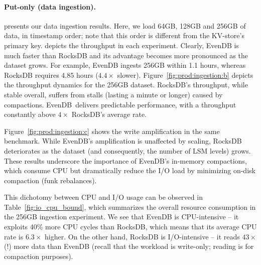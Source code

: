 \documentclass[sigplan,10pt]{acmart}
\newcommand{\sys}{EvenDB}
\providecommand{\DIFadd}[1]{{\protect\color{blue}\uwave{#1}}} %
\providecommand{\DIFdel}[1]{{\protect\color{red}\sout{#1}}}                      %
\providecommand{\DIFaddbegin}{} %
\providecommand{\DIFaddend}{} %
\providecommand{\DIFdelbegin}{} %
\providecommand{\DIFdelend}{} %
\begin{document}
\paragraph{Put-only (data ingestion).} 
 presents our  data ingestion results. 
Here, we load 64GB, 128GB and 256GB of data, in timestamp order; note that this order is different from the KV-store's primary key. 
  depicts the throughput in each experiment. Clearly, \sys\/ is much faster than RocksDB and its advantage 
becomes more pronounced as the dataset grows. For example, \sys\/ ingests 256GB  within 1.1 hours, 
whereas RocksDB requires 4.85 hours (\DIFdelbegin \DIFdel{$4.4\times$ }\DIFdelend \DIFaddbegin \DIFadd{4.4x }\DIFaddend slower). Figure~\ref{fig:prod:ingestion:b} depicts the  
throughput dynamics for the 256GB dataset. RocksDB's throughput, while stable overall, suffers from stalls 
(lasting a minute or longer) caused by compactions. 
\sys\ delivers predictable performance, with a throughput constantly above \DIFdelbegin \DIFdel{$4\times$ }\DIFdelend \DIFaddbegin \DIFadd{4x }\DIFaddend RocksDB's average rate.

Figure~\ref{fig:prod:ingestion:c} shows the write amplification in the same benchmark. 
While \sys's amplification is unaffected by  scaling, RocksDB deteriorates as the dataset (and consequently, the number of LSM levels) grows. 
These results underscore the importance of \sys's in-memory compactions, which consume CPU 
but dramatically reduce the I/O load by minimizing on-disk compaction (funk rebalances). 

This dichotomy between CPU and I/O usage can be observed in 
Table~\ref{fig:io_cpu_bound}, which summarizes  the overall resource consumption in the  256GB ingestion
experiment. We see that \sys\/ is CPU-intensive -- it exploits 40\% more CPU cycles than RocksDB, which means that its average CPU rate is \DIFdelbegin \DIFdel{$6.3\times$ }\DIFdelend \DIFaddbegin \DIFadd{6.3x }\DIFaddend higher. 
On the other hand, RocksDB is I/O-intensive -- it reads \DIFdelbegin \DIFdel{$43\times$ }\DIFdelend \DIFaddbegin \DIFadd{43x }\DIFaddend (!) more data than \sys\/ (recall that the workload is write-only; reading is for compaction purposes). 
\end{document}
